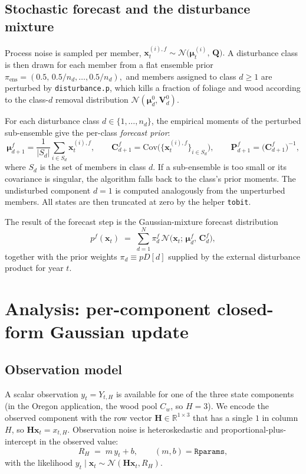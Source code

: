 \documentclass[11pt]{article}
\newcommand{\R}{\mathbb{R}}
\newcommand{\inv}{^{-1}}
\begin{document}
\subsection{Stochastic forecast and the disturbance mixture}

Process noise is sampled per member,
\(
  \bm x^{(i),f}_t \sim \mathcal N\!\bigl(\bm\mu^{(i)}_t,\,\bm Q\bigr).
\)
A disturbance class is then drawn for each member from a flat ensemble
prior
\(
  \pi_{\mathrm{ens}} = (0.5,\, 0.5/n_d, \dots, 0.5/n_d),
\)
and members assigned to class $d \ge 1$ are perturbed by
\texttt{disturbance.p}, which kills a fraction of foliage and wood
according to the class-$d$ removal distribution
$\mathcal N(\bm\mu^{0}_d, \bm V^{0}_d)$.

For each disturbance class $d \in \{1,\dots,n_d\}$, the empirical
moments of the perturbed sub-ensemble give the per-class \emph{forecast
prior}:
\[
  \bm\mu^{f}_{d+1}
  = \frac{1}{|S_d|}\sum_{i \in S_d} \bm x^{(i),f}_t,
  \qquad
  \bm C^{f}_{d+1}
  = \mathrm{Cov}\bigl(\{\bm x^{(i),f}_t\}_{i \in S_d}\bigr),
  \qquad
  \bm P^{f}_{d+1} = \bigl(\bm C^{f}_{d+1}\bigr)\inv,
\]
where $S_d$ is the set of members in class $d$.  If a sub-ensemble is
too small or its covariance is singular, the algorithm falls back to the
class's prior moments.  The undisturbed component $d=1$ is computed
analogously from the unperturbed members.  All states are then truncated
at zero by the helper \texttt{tobit}.

The result of the forecast step is the Gaussian-mixture forecast
distribution
\begin{equation}
  p^{f}(\bm x_t)
  \;=\;
  \sum_{d=1}^{N} \pi^{f}_d\,
                 \mathcal N\!\bigl(\bm x_t;\, \bm\mu^{f}_d,\, \bm C^{f}_d\bigr),
  \label{eq:forecast-mixture}
\end{equation}
together with the prior weights $\pi_d \equiv pD[d]$ supplied by the
external disturbance product for year $t$.

\bigskip

\section{Analysis: per-component closed-form Gaussian update}
\label{sec:analysis}

\subsection{Observation model}

A scalar observation $y_t = Y_{t,H}$ is available for one of the three
state components (in the Oregon application, the wood pool $C_w$, so
$H = 3$).  We encode the observed component with the row vector
$\bm H \in \R^{1 \times 3}$ that has a single $1$ in column $H$, so
$\bm H \bm x_t = x_{t,H}$.  Observation noise is heteroskedastic and
proportional-plus-intercept in the observed value:
\[
  R_H \;=\; m\, y_t + b,
  \qquad (m, b) = \texttt{Rparams},
\]
with the likelihood $y_t \mid \bm x_t \sim \mathcal N(\bm H \bm x_t, R_H)$.
\end{document}
